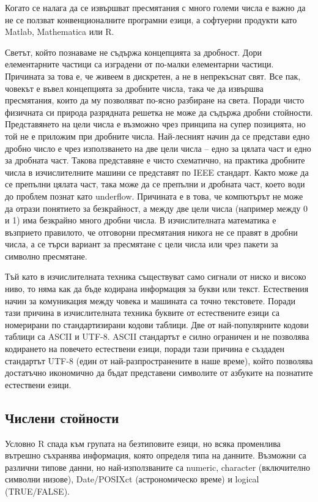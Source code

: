 Когато се налага да се извършват пресмятания с много големи числа е важно да не се ползват конвенционалните програмни езици, а софтуерни продукти като Matlab, Mathematica или R.

Светът, който познаваме не съдържа концепцията за дробност. Дори елементарните частици са изградени от по-малки елементарни частици. Причината за това е, че живеем в дискретен, а не в непрекъснат свят. Все пак, човекът е въвел концепцията за дробните числа, така че да извършва пресмятания, които да му позволяват по-ясно разбиране на света. Поради чисто физичната си природа разрядната решетка не може да съдържа дробни стойности. Представянето на цели числа е възможно чрез принципа на супер позицията, но той не е приложим при дробните числа. Най-лесният начин да се представи едно дробно число е чрез използването на две цели числа – едно за цялата част и едно за дробната част. Такова представяне е чисто схематично, на практика дробните числа в изчислителните машини се представят по IEEE стандарт. Както може да се препълни цялата част, така може да се препълни и дробната част, което води до проблем познат като underflow. Причината е в това, че компютърът не може да отрази понятието за безкрайност, а между две цели числа (например между 0 и 1) има безкрайно много дробни числа. В изчислителната математика е възприето правилото, че отговорни пресмятания никога не се правят в дробни числа, а се търси вариант за пресмятане с цели числа или чрез пакети за символно пресмятане.

Тъй като в изчислителната техника съществуват само сигнали от ниско и високо ниво, то няма как да бъде кодирана информация за букви или текст. Естествения начин за комуникация между човека и машината са точно текстовете. Поради тази причина в изчислителната техника буквите от естествените езици са номерирани по стандартизирани кодови таблици. Две от най-популярните кодови таблици са ASCII и UTF-8. ASCII стандартът е силно ограничен и не позволява кодирането на повечето естествени езици, поради тази причина е създаден стандартът UTF-8 (един от най-разпространените в наше време), който позволява достатъчно икономично да бъдат представени символите от азбуките на познатите естествени езици.

\subsection{Числени стойности}

Условно R спада към групата на безтиповите езици, но всяка променлива вътрешно съхранява информация, която определя типа на данните. Възможни са различни типове данни, но най-използваните са numeric, character (включително символни низове), Date/POSIXct (астрономическо време) и logical (TRUE/FALSE).

